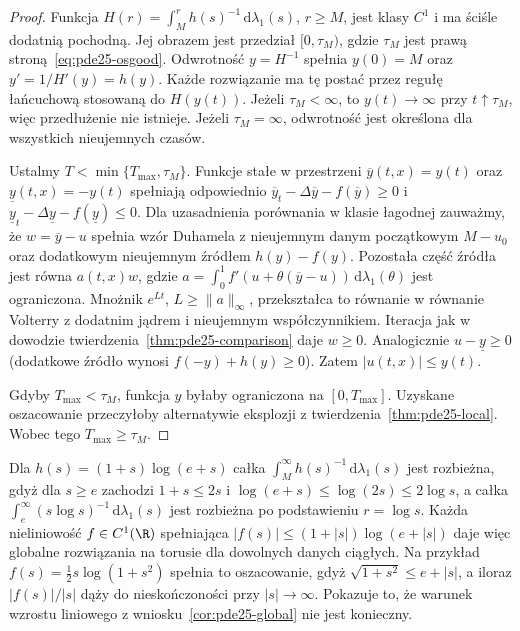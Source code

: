 \begin{proof}
Funkcja $H(r)=\int_M^r h(s)^{-1}\,\mathrm d\lambda_1(s)$,
$r\ge M$, jest klasy $C^1$ i ma ściśle dodatnią
pochodną. Jej obrazem jest przedział $[0,\tau_M)$,
gdzie $\tau_M$ jest prawą stroną~\eqref{eq:pde25-osgood}.
Odwrotność $y=H^{-1}$ spełnia $y(0)=M$ oraz
$y'=1/H'(y)=h(y)$. Każde rozwiązanie ma tę postać
przez regułę łańcuchową stosowaną do $H(y(t))$.
Jeżeli $\tau_M<\infty$, to $y(t)\to\infty$ przy
$t\uparrow\tau_M$, więc przedłużenie nie istnieje.
Jeżeli $\tau_M=\infty$, odwrotność jest określona
dla wszystkich nieujemnych czasów.

Ustalmy $T<\min\{T_{\max},\tau_M\}$. Funkcje stałe
w przestrzeni $\overline y(t,x)=y(t)$ oraz
$\underline y(t,x)=-y(t)$ spełniają odpowiednio
$\overline y_t-\Delta\overline y-f(\overline y)\ge0$
i $\underline y_t-\Delta\underline y-f(\underline y)\le0$.
Dla uzasadnienia porównania w klasie łagodnej zauważmy,
że $w=\overline y-u$ spełnia wzór Duhamela z nieujemnym
danym początkowym $M-u_0$ oraz dodatkowym nieujemnym
źródłem $h(y)-f(y)$. Pozostała część źródła jest równa
$a(t,x)w$, gdzie
$a=\int_0^1f'(u+\theta(\overline y-u))\,\mathrm d\lambda_1(\theta)$
jest ograniczona. Mnożnik $e^{Lt}$, $L\ge\|a\|_\infty$,
przekształca to równanie w równanie Volterry z dodatnim
jądrem i nieujemnym współczynnikiem. Iteracja jak w dowodzie
twierdzenia~\ref{thm:pde25-comparison} daje $w\ge0$.
Analogicznie $u-\underline y\ge0$ (dodatkowe źródło wynosi
$f(-y)+h(y)\ge0$). Zatem $|u(t,x)|\le y(t)$.

Gdyby $T_{\max}<\tau_M$, funkcja $y$ byłaby ograniczona
na $[0,T_{\max}]$. Uzyskane oszacowanie przeczyłoby
alternatywie eksplozji z twierdzenia~\ref{thm:pde25-local}.
Wobec tego $T_{\max}\ge\tau_M$.
\end{proof}

\begin{przyklad}
Dla $h(s)=(1+s)\log(e+s)$ całka
$\int_M^\infty h(s)^{-1}\,\mathrm d\lambda_1(s)$ jest rozbieżna,
gdyż dla $s\ge e$ zachodzi $1+s\le2s$ i
$\log(e+s)\le\log(2s)\le2\log s$, a całka
$\int_e^\infty (s\log s)^{-1}\,\mathrm d\lambda_1(s)$
jest rozbieżna po podstawieniu $r=\log s$.
Każda nieliniowość $f\in C^1(\R)$ spełniająca
$|f(s)|\le(1+|s|)\log(e+|s|)$ daje więc globalne
rozwiązania na torusie dla dowolnych danych ciągłych.
Na przykład $f(s)=\tfrac12s\log(1+s^2)$
spełnia to oszacowanie, gdyż
$\sqrt{1+s^2}\le e+|s|$, a iloraz $|f(s)|/|s|$
dąży do nieskończoności przy $|s|\to\infty$.
Pokazuje to, że warunek wzrostu liniowego z
wniosku~\ref{cor:pde25-global} nie jest konieczny.
\end{przyklad}


